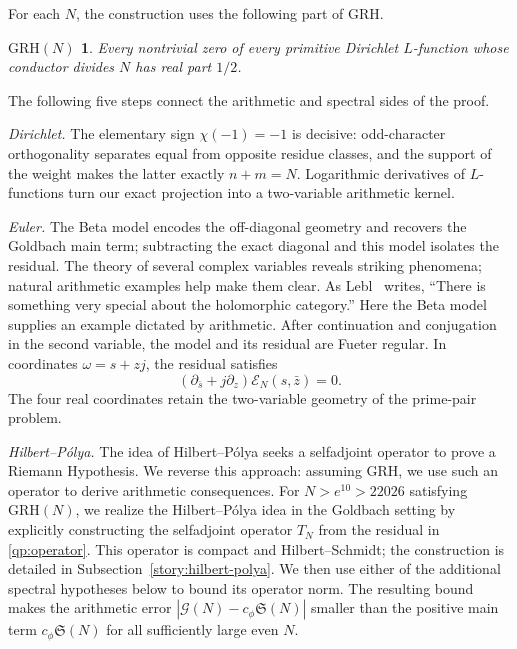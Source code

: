 \documentclass[12pt,a4paper]{amsart}
\numberwithin{equation}{section}
\theoremstyle{plain}
\newtheorem*{grh}{\(\mathrm{GRH}(N)\)}
\theoremstyle{definition}
\theoremstyle{remark}
\begin{document}
For each $N$, the construction uses the following part of GRH.

\begin{grh}
Every nontrivial zero of every primitive Dirichlet $L$-function
whose conductor divides $N$ has real part $1/2$.
\end{grh}

The following five steps connect the arithmetic and spectral sides of the proof.

\emph{Dirichlet.} The elementary sign $\chi(-1)=-1$ is decisive:
odd-character orthogonality separates equal from opposite residue
classes, and the support of the weight makes the latter exactly
$n+m=N$.
Logarithmic derivatives of $L$-functions turn our exact projection
into a two-variable arithmetic kernel.

\emph{Euler.} The Beta model encodes the off-diagonal geometry
and recovers the Goldbach main term; subtracting the exact diagonal
and this model isolates the residual. The theory of several complex
variables reveals striking phenomena; natural arithmetic examples
help make them clear.
As Lebl~\cite[\S1.1]{LeblSCV} writes,
``There is something very special about the holomorphic
category.'' Here the Beta model supplies an example dictated by
arithmetic. After continuation and conjugation in the second
variable, the model and its residual are Fueter regular. In coordinates
$\omega=s+zj$, the residual satisfies
\[
 (\partial_{\bar s}+j\partial_z)\mathscr E_N(s,\bar z)=0.
\]
The four real coordinates retain the two-variable geometry of
the prime-pair problem.

\emph{Hilbert--P\'olya.} The idea of Hilbert--P\'olya seeks a selfadjoint
operator to prove a Riemann Hypothesis. We reverse this approach:
assuming GRH, we use such an operator to derive arithmetic consequences.
For $N>e^{10}>22026$ satisfying $\mathrm{GRH}(N)$, we realize the
Hilbert--P\'olya idea in the Goldbach setting by explicitly constructing
the selfadjoint operator $T_N$ from the residual in \eqref{qp:operator}.
This operator is compact and Hilbert--Schmidt; the construction is
detailed in Subsection~\ref{story:hilbert-polya}. We then use either of
the additional spectral hypotheses below to bound its operator norm.
The resulting bound makes the arithmetic error
$|\mathcal G(N)-c_\phi\mathfrak S(N)|$ smaller than the positive main term
$c_\phi\mathfrak S(N)$ for all sufficiently large even $N$.
\end{document}
